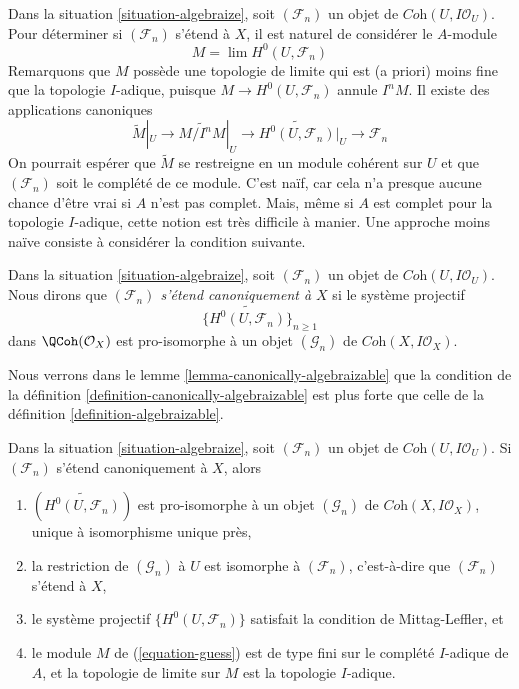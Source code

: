 \noindent
Dans la situation \ref{situation-algebraize}, soit $(\mathcal{F}_n)$ un
objet de $\textit{Coh}(U, I\mathcal{O}_U)$. Pour déterminer si
$(\mathcal{F}_n)$ s'étend à $X$, il est naturel de considérer le $A$-module
\begin{equation}
\label{equation-guess}
M = \lim H^0(U, \mathcal{F}_n)
\end{equation}
Remarquons que $M$ possède une topologie de limite qui est (a priori) moins fine que
la topologie $I$-adique, puisque $M \to H^0(U, \mathcal{F}_n)$ annule $I^nM$.
Il existe des applications canoniques
$$
\widetilde{M}|_U \to \widetilde{M/I^nM}|_U \to
\widetilde{H^0(U, \mathcal{F}_n)}|_U \to
\mathcal{F}_n
$$
On pourrait espérer que $\widetilde{M}$ se restreigne en un module cohérent
sur $U$ et que $(\mathcal{F}_n)$ soit le complété de ce module.
C'est naïf, car cela n'a presque aucune chance d'être vrai
si $A$ n'est pas complet. Mais, même si $A$ est complet pour la topologie $I$-adique,
cette notion est très difficile à manier.
Une approche moins naïve consiste à considérer la condition suivante.

\begin{definition}
\label{definition-canonically-algebraizable}
Dans la situation \ref{situation-algebraize}, soit $(\mathcal{F}_n)$ un
objet de $\textit{Coh}(U, I\mathcal{O}_U)$. Nous dirons que
{\it $(\mathcal{F}_n)$ s'étend canoniquement à $X$} si le
système projectif
$$
\{\widetilde{H^0(U, \mathcal{F}_n)}\}_{n \geq 1}
$$
dans $\QCoh(\mathcal{O}_X)$ est pro-isomorphe à un objet
$(\mathcal{G}_n)$ de $\textit{Coh}(X, I\mathcal{O}_X)$.
\end{definition}

\noindent
Nous verrons dans le lemme \ref{lemma-canonically-algebraizable}
que la condition de la définition \ref{definition-canonically-algebraizable}
est plus forte que celle de la définition \ref{definition-algebraizable}.

\begin{lemma}
\label{lemma-canonically-algebraizable}
Dans la situation \ref{situation-algebraize}, soit $(\mathcal{F}_n)$ un
objet de $\textit{Coh}(U, I\mathcal{O}_U)$. Si $(\mathcal{F}_n)$
s'étend canoniquement à $X$, alors
\begin{enumerate}
\item $(\widetilde{H^0(U, \mathcal{F}_n)})$ est pro-isomorphe à un
objet $(\mathcal{G}_n)$ de $\textit{Coh}(X, I \mathcal{O}_X)$,
unique à isomorphisme unique près,
\item la restriction de $(\mathcal{G}_n)$ à $U$ est isomorphe
à $(\mathcal{F}_n)$, c'est-à-dire que $(\mathcal{F}_n)$ s'étend à $X$,
\item le système projectif $\{H^0(U, \mathcal{F}_n)\}$
satisfait la condition de Mittag-Leffler, et
\item le module $M$ de (\ref{equation-guess}) est de type fini sur le
complété $I$-adique de $A$, et la topologie de limite sur
$M$ est la topologie $I$-adique.
\end{enumerate}
\end{lemma}

